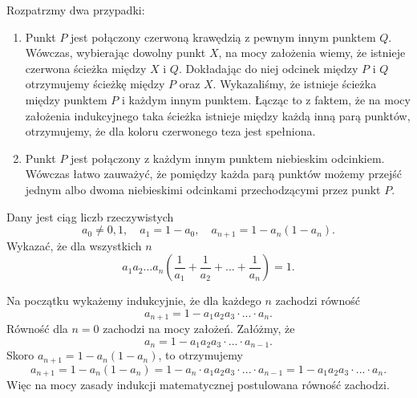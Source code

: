 Rozpatrzmy dwa przypadki:
\begin{enumerate}
	\item Punkt $P$ jest połączony czerwoną krawędzią z pewnym innym punktem $Q$. Wówczas, wybierając dowolny punkt $X$, na mocy założenia wiemy, że istnieje czerwona ścieżka między $X$ i $Q$. Dokładając do niej odcinek między $P$ i $Q$ otrzymujemy ścieżkę między $P$ oraz $X$.
	Wykazaliśmy, że istnieje ścieżka między punktem $P$ i każdym innym punktem. Łącząc to z faktem, że na mocy założenia indukcyjnego taka ścieżka istnieje między każdą inną parą punktów, otrzymujemy, że dla koloru czerwonego teza jest spełniona.
	\item Punkt $P$ jest połączony z każdym innym punktem niebieskim odcinkiem. Wówczas łatwo zauważyć, że pomiędzy każda parą punktów możemy przejść jednym albo dwoma niebieskimi odcinkami przechodzącymi przez punkt $P$.
\end{enumerate}

\begin{problem}{5}
Dany jest ciąg liczb rzeczywistych
\[
	a_0 \neq 0, 1,\quad a_1 = 1 - a_0,\quad a_{n + 1} = 1 - a_n(1 - a_n). 
\]
Wykazać, że dla wszystkich $n$ 
\[
	a_1a_2...a_n\left(\frac{1}{a_1} + \frac{1}{a_2} + ... + \frac{1}{a_n}\right) = 1.
\]
\end{problem}

\noindent
Na początku wykażemy indukcyjnie, że dla każdego $n$ zachodzi równość
\[
	a_{n + 1} = 1 - a_1a_2a_3\cdot ... \cdot a_{n}.
\]
Równość dla $n = 0$ zachodzi na mocy założeń.
Załóżmy, że
\[
	a_{n} = 1 - a_1a_2a_3\cdot ... \cdot a_{n - 1}.
\]
Skoro $a_{n + 1} = 1 - a_n(1 - a_n)$, to otrzymujemy
\[
	a_{n + 1} = 1 - a_n(1 - a_n) = 1 - a_n \cdot a_1a_2a_3\cdot ... \cdot a_{n - 1} = 1 - a_1a_2a_3\cdot ... \cdot a_{n}.
\]
Więc na mocy zasady indukcji matematycznej postulowana równość zachodzi.
\vspace{10px}

